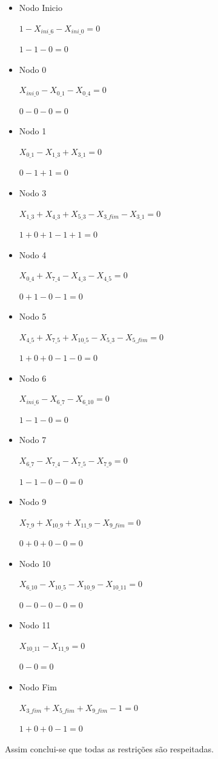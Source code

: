 \begin{itemize}

\item Nodo Inicio 

$1-X_{ini\_6} - X_{ini\_0} = 0$

$1 - 1 - 0 = 0$

\item Nodo 0 

$X_{ini\_0}-X_{0\_1}-X_{0\_4} = 0$

$0 - 0 - 0 = 0$

\item Nodo 1 


$	X_{0\_1}-X_{1\_3} + X_{3\_1} = 0$

$0 - 1 + 1 = 0$

\item Nodo 3 


$	X_{1\_3} + X_{4\_3} + X_{5\_3}-X_{3\_fim} - X_{3\_1} = 0$

$1 + 0 + 1 - 1 + 1 = 0$

\item Nodo 4 

$	X_{0\_4} + X_{7\_4} - X_{4\_3} - X_{4\_5} = 0$

$0 + 1 - 0 - 1= 0$

\item Nodo 5 

$X_{4\_5} + X_{7\_5} + X_{10\_5} - X_{5\_3} - X_{5\_fim} = 0$

$1 + 0 + 0 - 1 - 0 = 0$

\item Nodo 6 

$X_{ini\_6} - X_{6\_7} - X_{6\_10} = 0$

$1 - 1 - 0 = 0$

\item Nodo 7 

$X_{6\_7}- X_{7\_4}- X_{7\_5} - X_{7\_9} = 0$

$1 - 1 - 0 - 0 = 0$

\item Nodo 9 

$X_{7\_9} + X_{10\_9} + X_{11\_9} - X_{9\_fim} = 0$

$0 + 0 + 0 - 0 = 0$

\item Nodo 10 

$X_{6\_10} - X_{10\_5} - X_{10\_9} - X_{10\_11} = 0$

$0 - 0 - 0 - 0 = 0$

\item Nodo 11 

$X_{10\_11} - X_{11\_9} = 0$

$0 - 0 = 0$

\item Nodo Fim 

$X_{3\_fim} + X_{5\_fim} + X_{9\_fim} - 1 = 0$

$1 + 0 + 0 - 1 = 0$



\end{itemize}


Assim conclui-se que todas as restrições são respeitadas.
